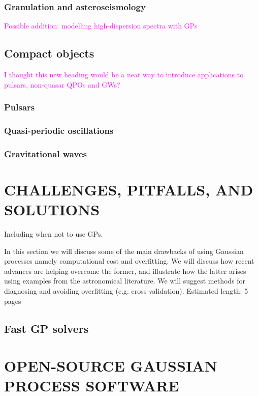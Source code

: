 \documentclass[letterpaper]{ar-1col}
\newcommand{\suz}[1]{\textcolor{magenta}{#1}}
\begin{document}
\subsubsection{Granulation and asteroseismology}


\suz{Possible addition: modelling high-dispersion spectra with GPs}

\subsection{Compact objects}
\suz{I thought this new heading would be a neat way to introduce applications to pulsars, non-quasar QPOs and GWs?}

\subsubsection{Pulsars}

\subsubsection{Quasi-periodic oscillations}

\subsubsection{Gravitational waves}

\section{CHALLENGES, PITFALLS, AND SOLUTIONS}
\label{sec:challenges}

Including when not to use GPs.

In this section we will discuss some of the main drawbacks of using Gaussian processes namely computational cost and overfitting. We will discuss how recent advances are helping overcome the former, and illustrate how the latter arises using examples from the astronomical literature. We will suggest methods for diagnosing and avoiding overfitting (e.g. cross validation). Estimated length: 5 pages

\subsection{Fast GP solvers}
\label{sec:fast}

\section{OPEN-SOURCE GAUSSIAN PROCESS SOFTWARE}
\end{document}
